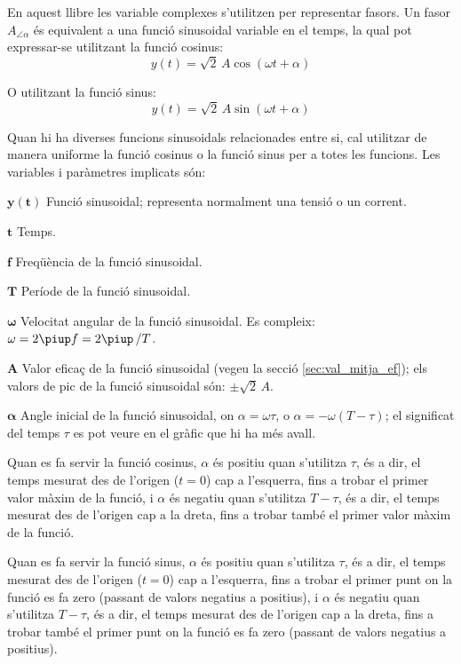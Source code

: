 \pagebreak

En aquest llibre les variable complexes s'utilitzen per representar fasors. Un fasor $A_{\angle \alpha}$ és equivalent a una funció sinusoidal variable en el temps, la qual pot expressar-se utilitzant la funció cosinus:
\[y(t)=\sqrt{2}\, A \cos(\omega t + \alpha)\]

O utilitzant la funció sinus:
\[y(t)=\sqrt{2}\, A \sin(\omega t + \alpha)\]

Quan hi ha diverses funcions sinusoidals relacionades entre si, cal utilitzar de manera uniforme la funció cosinus o la funció sinus per a totes les funcions. Les variables i paràmetres implicats són:
\begin{list}{}
{\setlength{\labelwidth}{15mm} \setlength{\leftmargin}{20mm}
\setlength{\labelsep}{5mm}}
    \item[$\boldsymbol{y(t)}$] Funció sinusoidal; representa normalment una tensió o un corrent.
    \item[$\boldsymbol{t}$] Temps.
    \item[$\boldsymbol{f}$] Freqüència de la funció sinusoidal.
    \item[$\boldsymbol{T}$] Període de la funció sinusoidal.
    \item[$\boldsymbol{\omega}$] Velocitat angular de la funció sinusoidal. Es compleix: $\omega = 2 \piup f = 2 \piup\,/T$.
    \item[$\boldsymbol{A}$] Valor eficaç de la funció sinusoidal (vegeu la secció \vref{sec:val_mitja_ef}); els valors de pic de la funció sinusoidal  són:  $\pm\sqrt{2}\, A$.
    \item[$\boldsymbol{\alpha}$] Angle inicial de la funció sinusoidal, on  $\alpha=\omega \tau$, o $\alpha=-\omega (T-\tau)$; el significat del temps $\tau$  es pot veure en el gràfic que hi ha més avall.

    Quan es fa servir la funció cosinus, $\alpha$ és positiu quan s'utilitza $\tau$, és a dir, el temps mesurat  des de l'origen ($t=0$) cap a l'esquerra, fins a trobar el primer valor màxim de la funció, i $\alpha$ és negatiu quan s'utilitza $T-\tau$, és a dir, el temps mesurat des de l'origen cap a la dreta, fins a trobar també el primer valor màxim de la funció.

    Quan es fa servir la funció sinus, $\alpha$ és positiu quan s'utilitza $\tau$, és a dir, el temps mesurat des de l'origen ($t=0$) cap a l'esquerra, fins a trobar el primer punt on la funció es fa zero (passant de valors negatius a positius), i $\alpha$ és negatiu quan s'utilitza $T-\tau$, és a dir, el temps mesurat des de l'origen cap a la dreta, fins a trobar també el primer punt on la funció es fa zero (passant de valors negatius a positius).
    \item[] 
\end{list}

